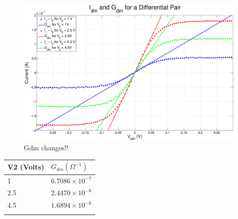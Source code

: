 \documentclass{article}
\begin{document}

\begin{figure}[H]
\centering
\includegraphics[width=\linewidth]{./Figures/Gdm.eps}
\caption{Gdm changes!!}
\label{fig:gdm}
\end{figure}

\begin{table}[h]
\begin{center}
    \begin{tabular}{ l | l  }
        V2 (Volts) & $G_{dm} (\Omega^{-1})$ \\
        \hline
        1 & $6.7086 \times 10^{-7}$ \\
        2.5 & $2.4470 \times 10^{-6}$ \\
        4.5 & $1.6894 \times 10^{-6}$ \\
        \label{tb:gdm}
    \end{tabular}
\end{center}
\end{table}


\end{document}
